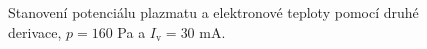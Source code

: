 \documentclass[a4paper,12pt]{article}
\begin{document}
\newpage
\begin{figure}[h]
	\centering
	\begin{subfigure}[b]{.49\textwidth}
		\centering
	\end{subfigure}
	\begin{subfigure}[b]{.49\textwidth}
		\centering
	\end{subfigure}
	\caption{Stanovení potenciálu plazmatu a elektronové teploty pomocí druhé 
	derivace, $p = 160$ 
	\si{\pascal} a $I_\text{v} = 30$ \si{\milli\ampere}.}
	\label{data1sec}
\end{figure}
\end{document}
